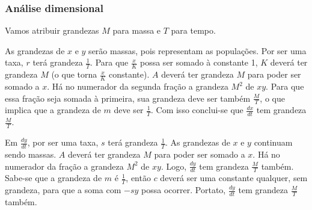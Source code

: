 
\subsubsection{Análise dimensional}

Vamos atribuir grandezas $M$ para massa e $T$ para tempo.

As grandezas de $x$ e $y$ serão massas, pois representam as populações. Por ser uma taxa, $r$ terá grandeza $\frac{1}{T}$. Para que $\frac{x}{K}$ possa ser somado à constante 1, $K$ deverá ter grandeza $M$ (o que torna $\frac{x}{K}$ constante). $A$ deverá ter grandeza $M$ para poder ser somado a $x$. Há no numerador da segunda fração a grandeza $M^2$ de $xy$. Para que essa fração seja somada à primeira, sua grandeza deve ser também $\frac{M}{T}$, o que implica que a grandeza de $m$ deve ser $\frac{1}{T}$. Com isso conclui-se que $\frac{dx}{dt}$ tem grandeza $\frac{M}{T}$.

Em $\frac{dy}{dt}$, por ser uma taxa, $s$ terá grandeza $\frac{1}{T}$. As grandezas de $x$ e $y$ continuam sendo massas. $A$ deverá ter grandeza $M$ para poder ser somado a $x$. Há no numerador da fração a grandeza $M^2$ de $xy$. Logo, $\frac{dy}{dt}$ tem grandeza $\frac{M}{T}$ também. Sabe-se que a grandeza de $m$ é $\frac{1}{T}$, então $c$ deverá ser uma constante qualquer, sem grandeza, para que a soma com $-sy$ possa ocorrer. Portato, $\frac{dy}{dt}$ tem grandeza $\frac{M}{T}$ também.

